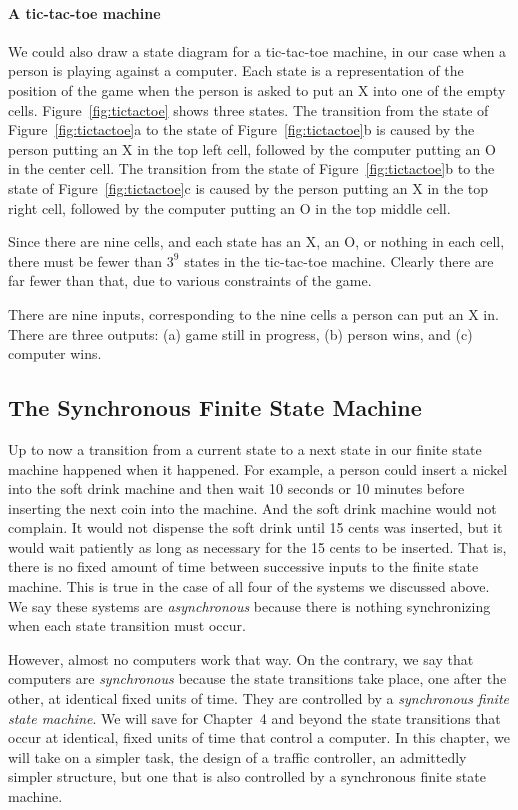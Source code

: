 \documentclass{patt}
\begin{document}
\paragraph{A tic-tac-toe machine}

We could also draw a state diagram for a tic-tac-toe machine, in our case
when a person is playing against a computer.  Each state
is a representation of the position of the game when the person is asked
to put an X into one of the empty cells.  Figure~\ref{fig:tictactoe} shows
three states.  The transition from the state of Figure~\ref{fig:tictactoe}a
to the state of Figure~\ref{fig:tictactoe}b is caused by the person putting
an X in the top left cell, followed by the computer putting an O in the
center cell.  The transition from the state of Figure~\ref{fig:tictactoe}b
to the state of Figure~\ref{fig:tictactoe}c is caused by the person putting
an X in the top right cell, followed by the computer putting an O in the top
middle cell.

Since there are nine cells, and each state has an X, an O, or nothing in each
cell, there must be fewer than $3^9$ states in the tic-tac-toe machine.
Clearly there are far fewer than that, due to various constraints of the game.

There are nine inputs, corresponding to the nine cells a person can put an 
X in.  There are three outputs: (a) game still in progress, (b) person wins, 
and (c) computer wins.

\subsection{The Synchronous Finite State Machine}

Up to now a transition from a current state to a next state in our finite state
machine happened when it happened.  For example, a person could insert a 
nickel into the soft drink machine and then wait 10 seconds or 10 minutes 
before inserting the next coin into the machine.  And the soft drink machine
would not complain.  It would not dispense the soft drink until 15 cents was
inserted, but it would wait patiently as long as necessary for the 15 cents to
be inserted.  That is, there is no fixed amount of time between successive 
\lightbulb[-18pt]
inputs to the finite state machine.  This is true in the case of all four
of the systems we discussed above.  We say these systems are {\em asynchronous}
because there is nothing synchronizing when each state transition must occur.

However, almost no computers work that way.  On the contrary, we say that
computers are {\em synchronous} because the state transitions take place, one
after the other, at identical fixed units of time.  They are controlled by a 
{\em synchronous finite state machine}.  We will save for Chapter~4 and beyond
the state transitions that occur at identical, fixed units of time that control 
a computer.  In this chapter, we will take on a simpler task, the design of 
a traffic controller, an admittedly  simpler structure, but one that is also 
controlled by a synchronous finite state machine. 
\end{document}
